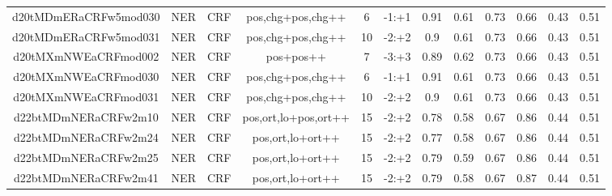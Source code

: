 \documentclass[a4paper]{article}
\begin{document}
\begin{landscape}
\begin{center}
\begin{tabular}{ |c|c|c|c|c|c|c|c|c|c|c|c|}
 		

 	
 
 	
 		
 		\small{ d20tMDmERaCRFw5mod030 } & NER & CRF & pos,chg+pos,chg++  &  6 &  -1:+1  &  0.91 & 0.61 & 0.73  &  0.66 & 0.43 & 0.51 \\
 		

 	
 
 	
 		
 		\small{ d20tMDmERaCRFw5mod031 } & NER & CRF & pos,chg+pos,chg++  &  10 &  -2:+2  &  0.9 & 0.61 & 0.73  &  0.66 & 0.43 & 0.51 \\
 		

 	
 
 	
 		
 		\small{ d20tMXmNWEaCRFmod002 } & NER & CRF & pos+pos++  &  7 &  -3:+3  &  0.89 & 0.62 & 0.73  &  0.66 & 0.43 & 0.51 \\
 		

 	
 
 	
 		
 		\small{ d20tMXmNWEaCRFmod030 } & NER & CRF & pos,chg+pos,chg++  &  6 &  -1:+1  &  0.91 & 0.61 & 0.73  &  0.66 & 0.43 & 0.51 \\
 		

 	
 
 	
 		
 		\small{ d20tMXmNWEaCRFmod031 } & NER & CRF & pos,chg+pos,chg++  &  10 &  -2:+2  &  0.9 & 0.61 & 0.73  &  0.66 & 0.43 & 0.51 \\
 		

 	
 
 	
 		
 		\small{ d22btMDmNERaCRFw2m10 } & NER & CRF & pos,ort,lo+pos,ort++  &  15 &  -2:+2  &  0.78 & 0.58 & 0.67  &  0.86 & 0.44 & 0.51 \\
 		

 	
 
 	
 		
 		\small{ d22btMDmNERaCRFw2m24 } & NER & CRF & pos,ort,lo+ort++  &  15 &  -2:+2  &  0.77 & 0.58 & 0.67  &  0.86 & 0.44 & 0.51 \\
 		

 	
 
 	
 		
 		\small{ d22btMDmNERaCRFw2m25 } & NER & CRF & pos,ort,lo+ort++  &  15 &  -2:+2  &  0.79 & 0.59 & 0.67  &  0.86 & 0.44 & 0.51 \\
 		

 	
 
 	
 		
 		\small{ d22btMDmNERaCRFw2m41 } & NER & CRF & pos,ort,lo+ort++  &  15 &  -2:+2  &  0.79 & 0.58 & 0.67  &  0.87 & 0.44 & 0.51 \\
 		


\end{tabular}
\end{center}
\end{landscape}
\end{document}
